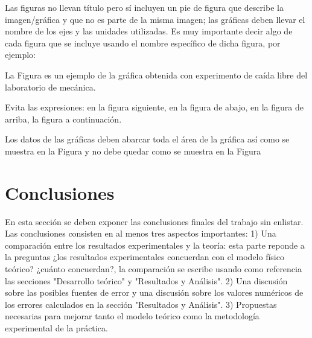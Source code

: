 \documentclass{article}
\begin{document}
\begin{multicols}{2}
Las figuras no llevan título pero sí incluyen un pie de figura que describe la imagen/gráfica y que no es parte de la misma imagen; las gr\'aficas deben llevar el nombre de los ejes y las unidades utilizadas. Es muy importante decir algo de cada figura que se incluye usando el nombre específico de dicha figura, por ejemplo: 

La Figura es un ejemplo de la gráfica obtenida con experimento de caída libre del laboratorio de mecánica. 

Evita las expresiones: en la figura siguiente, en la figura de abajo, en la figura de arriba, la figura a continuación. 

Los datos de las gráficas deben abarcar toda el área de la gráfica así como se muestra en la Figura y no debe quedar como se muestra en la Figura 





\section*{Conclusiones}\label{Conclusiones}				%

En esta sección se deben exponer las conclusiones finales del trabajo sin enlistar. Las conclusiones consisten en al menos tres aspectos importantes: 1) Una comparación entre los resultados experimentales y la teoría: esta parte reponde a la preguntas ¿los resultados experimentales concuerdan con el modelo físico teórico? ¿cuánto concuerdan?, la comparación se escribe usando como referencia las secciones "Desarrollo teórico" y "Resultados y Análisis". 2) Una discusión sobre las posibles fuentes de error y una discusión sobre los valores numéricos de los errores calculados en la sección "Resultados y Análisis". 3) Propuestas necesarias para mejorar tanto el modelo teórico como la metodología experimental de la práctica.

\begin{thebibliography}{9}						%

%
\end{thebibliography}


\end{multicols}
\end{document}
